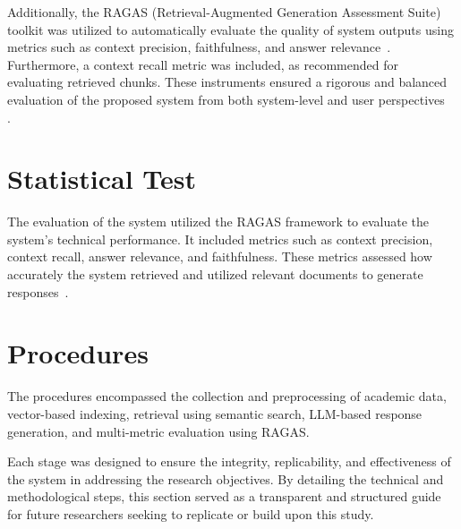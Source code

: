 \begin{refsection}
Additionally, the RAGAS (Retrieval-Augmented Generation Assessment Suite) toolkit was utilized to automatically evaluate the quality of system outputs using metrics such as context precision, faithfulness, and answer relevance~\cite{shinn2023ragas}. Furthermore, a context recall metric was included, as recommended for evaluating retrieved chunks. These instruments ensured a rigorous and balanced evaluation of the proposed system from both system-level and user perspectives~ \cite{lin2021bert}.

\section{Statistical Test}

The evaluation of the system utilized the RAGAS framework to evaluate the system's technical performance. It included metrics such as context precision, context recall, answer relevance, and faithfulness. These metrics assessed how accurately the system retrieved and utilized relevant documents to generate responses~\cite{holmes2023chatbot, ameli2024ranking, lin2024satisfaction}.

\section{Procedures}

The procedures encompassed the collection and preprocessing of academic data, vector-based indexing, retrieval using semantic search, LLM-based response generation, and multi-metric evaluation using RAGAS.

Each stage was designed to ensure the integrity, replicability, and effectiveness of the system in addressing the research objectives. By detailing the technical and methodological steps, this section served as a transparent and structured guide for future researchers seeking to replicate or build upon this study.



\begin{enumerate}


\end{enumerate}
\end{refsection}
